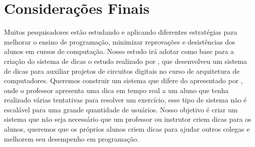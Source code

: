 \section{Considerações Finais}

Muitos pesquisadores estão estudando e aplicando diferentes estratégias para melhorar o ensino de programação, minimizar reprovações e desistências dos alunos em cursos de computação. Nosso estudo irá adotar como base para a criação do sistema de dicas o estudo realizado por , que desenvolveu um sistema de dicas para auxiliar projetos de circuitos digitais no curso de arquitetura de computadores. Queremos construir um sistema que difere do apresentado por , onde o professor apresenta uma dica em tempo real a um aluno que tenha realizado várias tentativas para resolver um exercício, esse tipo de sistema não é escalável para uma grande quantidade de usuários. Nosso objetivo é criar um sistema que não seja necessário que um professor ou instrutor criem dicas para os alunos, queremos que os próprios alunos criem dicas para ajudar outros colegas e melhorem seu desempenho em programação.